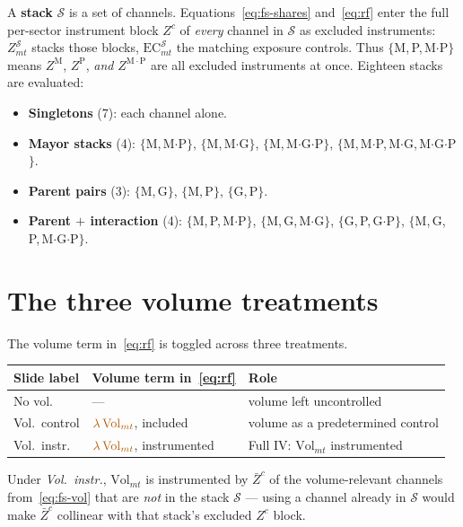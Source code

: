 \documentclass{article}
\newcommand{\tog}[1]{\textcolor{toggle}{#1}}
\newcommand{\EC}{\mathrm{EC}}
\newcommand{\Vol}{\mathrm{Vol}}
\newcommand{\Zbar}{\bar Z}
\newcommand{\cS}{\mathcal{S}}
\begin{document}
A \textbf{stack} $\cS$ is a set of channels. Equations~\eqref{eq:fs-shares}
and~\eqref{eq:rf} enter the full per-sector instrument block $Z^{c}$ of
\emph{every} channel in $\cS$ as excluded instruments: $Z^{\cS}_{mt}$ stacks
those blocks, $\EC^{\cS}_{mt}$ the matching exposure controls. Thus
$\{$M,\,P,\,M$\cdot$P$\}$ means $Z^{\mathrm M}$, $Z^{\mathrm P}$, \emph{and}
$Z^{\mathrm{M\cdot P}}$ are all excluded instruments at once. Eighteen stacks
are evaluated:

\begin{itemize}[leftmargin=*,nosep]
\item \textbf{Singletons} (7): each channel alone.
\item \textbf{Mayor stacks} (4): $\{$M,\,M$\cdot$P$\}$, $\{$M,\,M$\cdot$G$\}$,
  $\{$M,\,M$\cdot$G$\cdot$P$\}$, $\{$M,\,M$\cdot$P,\,M$\cdot$G,\,M$\cdot$G$\cdot$P$\}$.
\item \textbf{Parent pairs} (3): $\{$M,\,G$\}$, $\{$M,\,P$\}$, $\{$G,\,P$\}$.
\item \textbf{Parent $+$ interaction} (4): $\{$M,\,P,\,M$\cdot$P$\}$,
  $\{$M,\,G,\,M$\cdot$G$\}$, $\{$G,\,P,\,G$\cdot$P$\}$,
  $\{$M,\,G,\,P,\,M$\cdot$G$\cdot$P$\}$.
\end{itemize}

\section{The three volume treatments}\label{sec:vol}

The volume term in~\eqref{eq:rf} is toggled across three treatments.

\begin{center}
\begin{tabular}{lll}
\toprule
Slide label & Volume term in~\eqref{eq:rf} & Role \\
\midrule
No vol.\          & ---                                  & volume left uncontrolled \\
Vol.\ control     & $\tog{\lambda\,\Vol_{mt}}$, included  & volume as a predetermined control \\
Vol.\ instr.\     & $\tog{\lambda\,\Vol_{mt}}$, instrumented & Full IV: $\Vol_{mt}$ instrumented \\
\bottomrule
\end{tabular}
\end{center}

Under \emph{Vol.\ instr.}, $\Vol_{mt}$ is instrumented by $\Zbar^{c}$ of the
volume-relevant channels from~\eqref{eq:fs-vol} that are \emph{not} in the
stack $\cS$ --- using a channel already in $\cS$ would make $\Zbar^{c}$
collinear with that stack's excluded $Z^{c}$ block.
\end{document}
